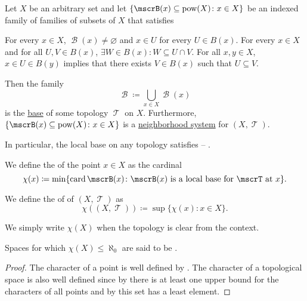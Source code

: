 \begin{proposition}\label{thm:topological_local_base_axioms}
  Let \( X \) be an arbitrary set and let \( \{ \mscrB(x) \subseteq \pow(X) \colon x \in X \} \) be an indexed family of families of subsets of \( X \) that satisfies
  \begin{thmenum}
     For every \( x \in X \), \( \mscrB(x) \neq \varnothing \) and \( x \in U \) for every \( U \in B(x) \).
     For every \( x \in X \) and for all \( U, V \in B(x) \), \( \exists W \in B(x): W \subseteq U \cap V \).
     For all \( x, y \in X \), \( x \in U \in B(y) \) implies that there exists \( V \in B(x) \) such that \( U \subseteq V \).
  \end{thmenum}

  Then the family
  \begin{equation*}
    \mscrB \coloneqq \bigcup_{x \in X} \mscrB(x)
  \end{equation*}
  is the \hyperref[thm:topological_base_axioms]{base} of some topology \( \mscrT \) on \( X \). Furthermore, \( \{ \mscrB(x) \subseteq \pow(X) \colon x \in X \} \) is a \hyperref[def:topological_local_base]{neighborhood system} for \( (X, \mscrT) \).

  In particular, the local base on any topology satisfies  -- .
\end{proposition}

\begin{definition}\label{def:topological_space_character}
  We define the  of the point \( x \in X \) as the cardinal
  \begin{equation*}
    \chi(x) \coloneqq \min \{ \card \mscrB(x) \colon \mscrB(x) \text{ is a local base for } \mscrT \text{ at } x \}.
  \end{equation*}

  We define the  of of \( (X, \mscrT) \) as
  \begin{equation*}
    \chi((X, \mscrT)) \coloneqq \sup \{ \chi(x) \colon x \in X \}.
  \end{equation*}

  We simply write \( \chi(X) \) when the topology is clear from the context.

  Spaces for which \( \chi(X) \leq \aleph_0 \) are said to be .
\end{definition}
\begin{proof}
  The character of a point is well defined by . The character of a topological space is also well defined since by  there is at least one upper bound for the characters of all points and by  this set has a least element.
\end{proof}

